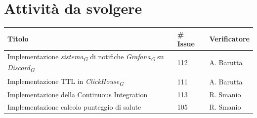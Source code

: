 \documentclass{article}
\begin{document}
    \section{Attività da svolgere}
    \begin{center}
        \begin{tabular}{|C{7cm}|C{1,5cm}|C{3cm}|}
            \hline
            \textbf{Titolo} & \textbf{\# Issue} & \textbf{Verificatore} \\
            \hline
            \hline
            Implementazione \textit{sistema}\textsubscript{\textit{G}} di notifiche \textit{Grafana}\textsubscript{\textit{G}} su \textit{Discord}\textsubscript{\textit{G}} & 112 & A. Barutta \\
            \hline
            Implementazione TTL in \textit{ClickHouse}\textsubscript{\textit{G}} & 111 & A. Barutta \\
            \hline
            Implementazione della Continuous Integration & 113 & R. Smanio \\
            \hline
            Implementazione calcolo punteggio di salute & 105 & R. Smanio\\
            \hline
        \end{tabular}
    \end{center}
\end{document}
